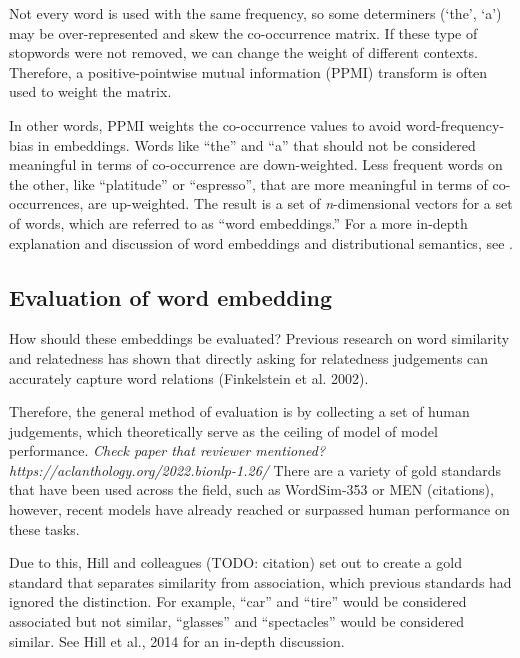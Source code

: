 
Not every word is used with the same frequency, so some determiners (`the', `a') may be over-represented and skew the co-occurrence matrix. If these type of stopwords were not removed, we can change the weight of different contexts. Therefore, a positive-pointwise mutual information (PPMI) transform is often used to weight the matrix. 

In other words, PPMI weights the co-occurrence values to avoid word-frequency-bias in embeddings. Words like ``the'' and ``a'' that should not be considered meaningful in terms of co-occurrence are down-weighted. Less frequent words on the other, like ``platitude'' or ``espresso'', that are more meaningful in terms of co-occurrences, are up-weighted. The result is a set of \textit{n}-dimensional vectors for a set of words, which are referred to as ``word embeddings.'' For a more in-depth explanation and discussion of word embeddings and distributional semantics, see \cite{lenci2018distributional}.


\subsection{Evaluation of word embedding}

How should these embeddings be evaluated? Previous research on word similarity and relatedness has shown that directly asking for relatedness judgements can accurately capture word relations (Finkelstein et al. 2002).

Therefore, the general method of evaluation is by collecting a set of human judgements, which theoretically serve as the ceiling of model of model performance. \textit{Check paper that reviewer mentioned? https://aclanthology.org/2022.bionlp-1.26/}
There are a variety of gold standards that have been used across the field, such as WordSim-353 or MEN (citations), however, recent models have already reached or surpassed human performance on these tasks.

Due to this, Hill and colleagues (TODO: citation) set out to create a gold standard that separates similarity from association, which previous standards had ignored the distinction.
For example, ``car'' and ``tire'' would be considered associated but not similar, ``glasses'' and ``spectacles'' would be considered similar. See Hill et al., 2014 for an in-depth discussion.

